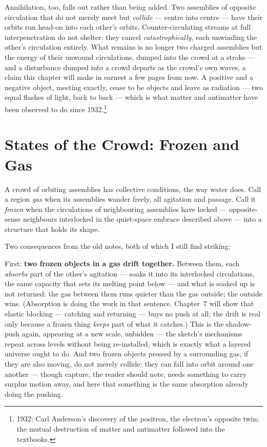 \documentclass[fontsize=11pt,paper=a4,pagesize=auto,parskip=half-]{scrbook}
\begin{document}
Annihilation, too, falls out rather than being added. Two assemblies of opposite circulation that do not merely meet but \emph{collide} --- centre into centre --- have their orbits run head-on into each other's orbits. Counter-circulating streams at full interpenetration do not shelter; they cancel \emph{catastrophically}, each unwinding the other's circulation entirely. What remains is no longer two charged assemblies but the energy of their unwound circulations, dumped into the crowd at a stroke --- and a disturbance dumped into a crowd departs as the crowd's own waves, a claim this chapter will make in earnest a few pages from now. A positive and a negative object, meeting exactly, cease to be objects and leave as radiation --- two equal flashes of light, back to back --- which is what matter and antimatter have been observed to do since 1932.\footnote{1932: Carl Anderson's discovery of the positron, the electron's opposite twin; the mutual destruction of matter and antimatter followed into the textbooks.}

\section{States of the Crowd: Frozen and Gas}

A crowd of orbiting assemblies has collective conditions, the way water does. Call a region \emph{gas} when its assemblies wander freely, all agitation and passage. Call it \emph{frozen} when the circulations of neighbouring assemblies have locked --- opposite-sense neighbours interlocked in the quiet-space embrace described above --- into a structure that holds its shape.

Two consequences from the old notes, both of which I still find striking:

First: \textbf{two frozen objects in a gas drift together.} Between them, each \emph{absorbs} part of the other's agitation --- soaks it into its interlocked circulations, the same capacity that sets its melting point below --- and what is soaked up is not returned: the gas between them runs quieter than the gas outside; the outside wins. (Absorption is doing the work in that sentence. Chapter~7 will show that elastic blocking --- catching and returning --- buys no push at all; the drift is real only because a frozen thing \emph{keeps} part of what it catches.) This is the shadow-push again, appearing at a new scale, unbidden --- the sketch's mechanisms repeat across levels without being re-installed, which is exactly what a layered universe ought to do. And two frozen objects pressed by a surrounding gas, if they are also moving, do not merely collide: they can fall into orbit around one another --- though capture, the reader should note, needs something to carry surplus motion away, and here that something is the same absorption already doing the pushing.
\end{document}
